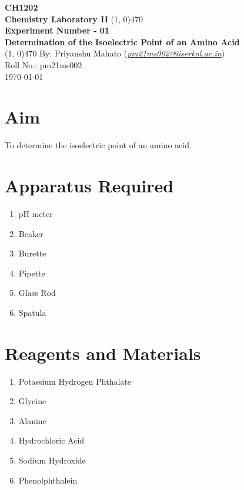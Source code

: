 \documentclass[12pt]{article}
\begin{document}
	\thispagestyle{empty}
	\begin{titlepage}
		\begin{center}
			\vspace{2cm}
			\huge\textbf{CH1202}\\
			\vspace{1cm}
			\large\textbf{Chemistry Laboratory II}
			\vfill
			\line(1, 0){470}\\[14pt]
			\huge\textbf{\color{ChadBlue}\sffamily Experiment Number - 01}\\[10pt]
			\Large\textbf{\color{mauve}\sffamily Determination of the Isoelectric Point of an Amino Acid}\\[14pt]
			\line(1, 0){470}
			\vfill
			By: Priyanshu Mahato (\href{mailto:pm21ms002@iiserkol.ac.in}{\emph{\color{dkgreen}pm21ms002@iiserkol.ac.in}})\\
			Roll No.: pm21ms002\\
			\today
		\end{center}
	\end{titlepage}

	\section{Aim}
	
	To determine the isoelectric point of an amino acid.
	
	\section{Apparatus Required}
	
	\begin{enumerate}
		\item pH meter
		\item Beaker
		\item Burette
		\item Pipette
		\item Glass Rod
		\item Spatula
	\end{enumerate}

	\section{Reagents and Materials}
	
	\begin{enumerate}
		\item Potassium Hydrogen Phthalate
		\item Glycine
		\item Alanine
		\item Hydrochloric Acid
		\item Sodium Hydroxide
		\item Phenolphthalein
	\end{enumerate}
\end{document}
